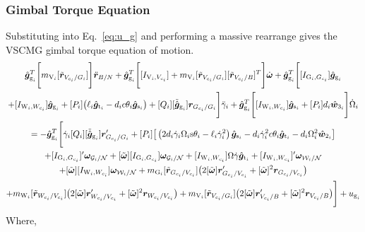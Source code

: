 \subsubsection{Gimbal Torque Equation}
Substituting into Eq.~\eqref{eq:u_g} and performing a massive rearrange gives the VSCMG gimbal torque equation of motion.
\begin{multline}
\hat{\bm g}_{\text{g}_i}^T \Bigg[ m_{\text{V}_i}[\tilde{\bm r}_{V_{c_i}/G_i}] \Bigg] \ddot{\bm r}_{B/N}
+ \hat{\bm g}_{\text{g}_i}^T \Bigg[ [I_{\text{V}_i,V_{c_i}}] + m_{\text{V}_i}[\tilde{\bm r}_{V_{c_i}/G_i}][\tilde{\bm{r}}_{V_{c_i}/B}]^T \Bigg] \dot{\bm{\omega}}
+ \hat{\bm g}_{\text{g}_i}^T \Bigg[ [I_{\text{G}_i,G_{c_i}}]\hat{\bm{g}}_{\text{g}_i} 
\\+ [I_{\text{W}_i,W_{c_i}}]\hat{\bm{g}}_{\text{g}_i} + [P_i] \big(\ell_i\hat{\bm{g}}_{\text{t}_i} - d_ic\theta_i\hat{\bm{g}}_{\text{s}_i}\big) + [Q_i] [\tilde{\hat{\bm g}}_{\text{g}_i}]\bm{r}_{G_{c_i}/G_i} \Bigg] \ddot{\gamma}_i
+ \hat{\bm g}_{\text{g}_i}^T \Bigg[ [I_{\text{W}_i,W_{c_i}}]\hat{\bm{g}}_{\text{s}_i} + [P_i] d_i\hat{\bm w}_{3_i} \Bigg] \dot{\Omega}_i
\\ = - \hat{\bm g}_{\text{g}_i}^T \Bigg[ \dot{\gamma}_i[Q_i][\tilde{\hat{\bm g}}_{\text{g}_i}]\bm{r}'_{G_{c_i}/G_i} + [P_i] \big[\left(2d_i\dot{\gamma}_i\Omega_i\text{s}\theta_i - \ell_i\dot{\gamma}_i^2\right)\hat{\bm{g}}_{\text{s}_i} - d_i\dot{\gamma}_i^2c\theta_i\hat{\bm{g}}_{\text{t}_i} - d_i\Omega_i^2 \hat{\bm{w}}_{2_i}\big]
\\+[I_{\text{G}_i,G_{c_i}}]'\bm\omega_{\mathcal{G}_i/\cal N} + [\tilde{\bm\omega}][I_{\text{G}_i,G_{c_i}}]\bm\omega_{\mathcal{G}_i/\cal N} + [I_{\text{W}_i,W_{c_i}}]\Omega\dot{\gamma}\hat{\bm{g}}_{\text{t}_i} + [I_{\text{W}_i,W_{c_i}}]'\bm\omega_{\mathcal{W}_i/\cal N} \\+ [\tilde{\bm{\omega}}][I_{\text{W}_i,W_{c_i}}]\bm\omega_{\mathcal{W}_i/\cal N}
+ m_{\text{G}_i}[\tilde{\bm{r}}_{G_{c_i}/V_{c_i}}] \big( 2[\tilde{\bm\omega}]\bm{r}'_{G_{c_i}/V_{c_i}} + [\tilde{\bm\omega}]^2\bm{r}_{G_{c_i}/V_{c_i}}\big)
\\ + m_{\text{W}_i}[\tilde{\bm{r}}_{W_{c_i}/V_{c_i}}]\big( 2[\tilde{\bm\omega}]\bm{r}'_{W_{c_i}/V_{c_i}} + [\tilde{\bm\omega}]^2\bm{r}_{W_{c_i}/V_{c_i}}\big)
+ m_{\text{V}_i}[\tilde{\bm r}_{V_{c_i}/G_i}]\big( 2[\tilde{\bm\omega}]\bm{r}'_{V_{c_i}/B} + [\tilde{\bm\omega}]^2\bm{r}_{V_{c_i}/B} \big) \Bigg] + u_{\text{g}_i}
\label{eq:vscmgtorque}
\end{multline} 
Where,
